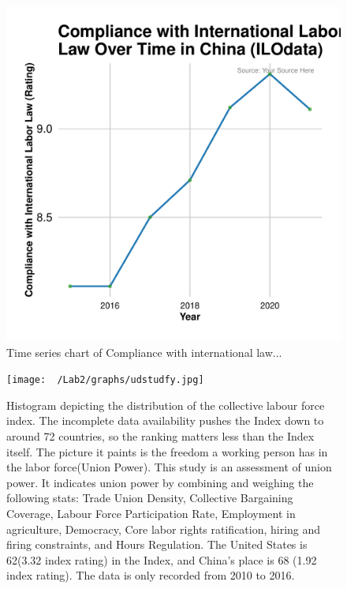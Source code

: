 \documentclass[11pt]{article}\usepackage[]{graphicx}\usepackage[]{xcolor}
\newenvironment{knitrout}{}{} %
\begin{document}
\begin{figure}[h!]
  \centering
  \begin{minipage}{0.6\linewidth}
\begin{knitrout}
\color{fgcolor}

{\centering \includegraphics[width=0.7\linewidth]{figure/China_labor_compliance-1} 

}


\end{knitrout}
    \caption{Time series chart of Compliance with international law...}
    \label{fig:labor-compliance-china}
  \end{minipage}
\end{figure}


\clearpage
\begin{figure}[h]
\centering
  \begin{minipage}{0.7\linewidth}
  \texttt{[image: ~/Lab2/graphs/udstudfy.jpg]}
  \caption{Histogram depicting the distribution of the collective labour force index. The incomplete data availability pushes the Index down to around 72 countries, so the ranking matters less than the Index itself. The picture it paints is the freedom a working person has in the labor force(Union Power). This study is an assessment of union power. It indicates union power by combining and weighing the following stats: Trade Union Density, Collective Bargaining Coverage, Labour Force Participation Rate, Employment in agriculture, Democracy, Core labor rights ratification, hiring and firing constraints, and Hours Regulation. The United States is 62(3.32 index rating) in the Index, and China's place is 68 (1.92 index rating). The data is only recorded from 2010 to 2016. }
  \label{fig:1}
  \end{minipage}
\end{figure}
\end{document}

